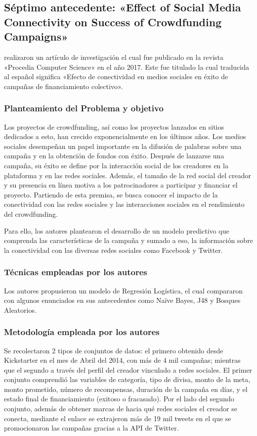 \subsection{Séptimo antecedente: «Effect of Social Media Connectivity on Success of Crowdfunding Campaigns» \citep*{pr_kaur2017socmedcrowd}}
\citeauthor{pr_kaur2017socmedcrowd} realizaron un artículo de investigación el cual fue publicado en la revista «Procedia Computer Science» en el año 2017. Este fue titulado  la cual traducida al español significa «Efecto de conectividad en medios sociales en éxito de campañas de financiamiento colectivo».

\subsubsection{Planteamiento del Problema y objetivo}
Los proyectos de crowdfunding, así como los proyectos lanzados en sitios dedicados a esto, han crecido exponencialmente en los últimos años. Los medios sociales desempeñan un papel importante en la difusión de palabras sobre una campaña y en la obtención de fondos con éxito. Después de lanzarse una campaña, su éxito se define por la interacción social de los creadores en la plataforma y en las redes sociales. Además, el tamaño de la red social del creador y su presencia en línea motiva a los patrocinadores a participar y financiar el proyecto. Partiendo de esta premisa, se busca conocer el impacto de la conectividad con las redes sociales y las interacciones sociales en el rendimiento del crowdfunding.

Para ello, los autores plantearon el desarrollo de un modelo predictivo que comprenda las características de la campaña y sumado a eso, la información sobre la conectividad con las diversas redes sociales como Facebook y Twitter.

\subsubsection{Técnicas empleadas por los autores}
Los autores propusieron un modelo de Regresión Logística, el cual compararon con algunos enunciados en sus antecedentes como Naïve Bayes, J48 y Bosques Aleatorios.

\subsubsection{Metodología empleada por los autores}
Se recolectaron 2 tipos de conjuntos de datos: el primero obtenido desde Kickstarter en el mes de Abril del 2014, con más de 4 mil campañas; mientras que el segundo a través del perfil del creador vinculado a redes sociales. El primer conjunto comprendió las variables de categoría, tipo de divisa, monto de la meta, monto prometido, número de recompensas, duración de la campaña en días, y el estado final de financiamiento (exitoso o fracasado). Por el lado del segundo conjunto, además de obtener marcas de hacia qué redes sociales el creador se conecta, mediante el enlace se extrajeron más de 19 mil tweets en el que se promocionaron las campañas gracias a la API de Twitter.

